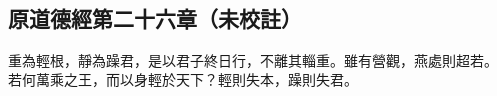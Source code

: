 ﻿%
%

\chapter{~}

\section{原道德經第二十六章（未校註）}

\begin{withgezhu}

\zhsong


\textcolor{tongjia-color}{重為輕根，靜為躁君，是以君子終日行，不離其輜重。雖有營觀，燕處則超若。}
若何萬乘之王，而以身輕於天下？輕則失本，躁則失君。

\end{withgezhu}
